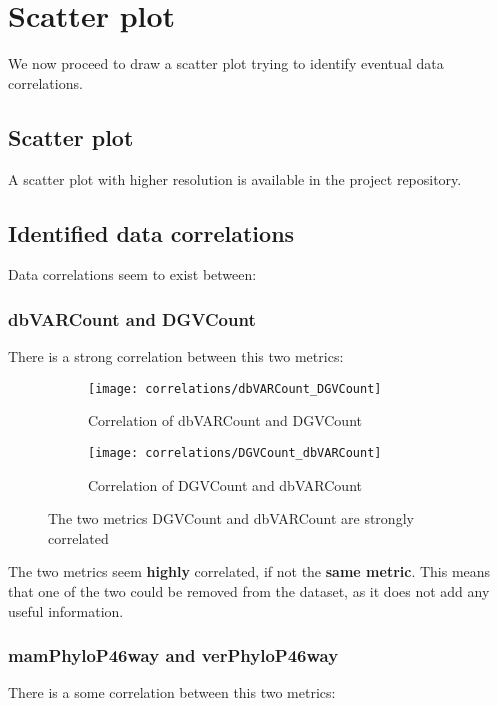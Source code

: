 \chapter{Scatter plot}
We now proceed to draw a scatter plot trying to identify eventual data correlations.

\section{Scatter plot}
A scatter plot with higher resolution is available in the project repository.
\begin{center}
\end{center}

\section{Identified data correlations}
Data correlations seem to exist between:

\subsection{dbVARCount and DGVCount}
There is a strong correlation between this two metrics:

\begin{figure}
	\begin{subfigure}{0.3\textwidth}
		\texttt{[image: correlations/dbVARCount\_DGVCount]}
		\caption{Correlation of dbVARCount and DGVCount}
	\end{subfigure}
	\begin{subfigure}{0.3\textwidth}
		\texttt{[image: correlations/DGVCount\_dbVARCount]}
		\caption{Correlation of DGVCount and dbVARCount}
	\end{subfigure}
	\caption{The two metrics DGVCount and dbVARCount are strongly correlated}
\end{figure}

The two metrics seem \textbf{highly} correlated, if not the \textbf{same metric}. This means that one of the two could be removed from the dataset, as it does not add any useful information.

\subsection{mamPhyloP46way and verPhyloP46way}
There is a some correlation between this two metrics:

